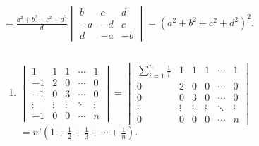 		$= \frac{a^2+b^2+c^2+d^2}{d} \begin{vmatrix}
				b  & c  & d  \\
				-a & -d & c  \\
				d  & -a & -b
			\end{vmatrix} = (a^2+b^2+c^2+d^2)^2$.


\subsection{} %


	\paragraph{} %
		\begin{enumerate}
			\item %
			      $\begin{vmatrix}
					      1      & 1      & 1      & \cdots & 1      \\
					      -1     & 2      & 0      & \cdots & 0      \\
					      -1     & 0      & 3      & \cdots & 0      \\
					      \vdots & \vdots & \vdots & \ddots & \vdots \\
					      -1     & 0      & 0      & \cdots & n
				      \end{vmatrix} = \begin{vmatrix}
					      \sum_{i=1}^{n} \frac{1}{i} & 1      & 1      & 1      & \cdots & 1      \\
					      0                          & 2      & 0      & 0      & \cdots & 0      \\
					      0                          & 0      & 3      & 0      & \cdots & 0      \\
					      \vdots                     & \vdots & \vdots & \vdots & \ddots & \vdots \\
					      0                          & 0      & 0      & 0      & \cdots & n
				      \end{vmatrix}$
			      $= n! \left(1 + \frac{1}{2} + \frac{1}{3} + \cdots + \frac{1}{n}\right)$.


\end{enumerate}
